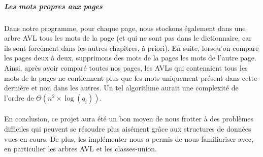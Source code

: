\documentclass[a4paper]{article}
\begin{document}
			\subparagraph{Les mots propres aux pages}{
			Dans notre programme, pour chaque page, nous stockons également dans une arbre AVL tous
			les mots de la page (et qui ne sont pas dans le dictionnaire, car ils sont forcément
			dans les autres chapitres, à priori). En suite, lorsqu'on compare les pages deux à 
			deux, supprimons des mots de la pages les mots de l'autre page. Ainsi, après avoir 
			comparé toutes nos pages, les AVLs qui contenaient tous les mots de la pages ne
			contiennent plus que les mots uniquement présent dans cette dernière et non dans les
			autres. Un tel algorithme aurait une complexité de l'ordre de 
			$\Theta(n^2 \times \log(q_i))$.
			}
		
		\paragraph{}{
		En conclusion, ce projet aura été un bon moyen de nous frotter à des problèmes difficiles qui peuvent
		se résoudre plus aisément grâce aux structures de données vues en cours. De plus, les 
		implémenter nous a permis de nous familiariser avec, en particulier les arbres AVL et
		les classes-union.
		}
		
\end{document}
